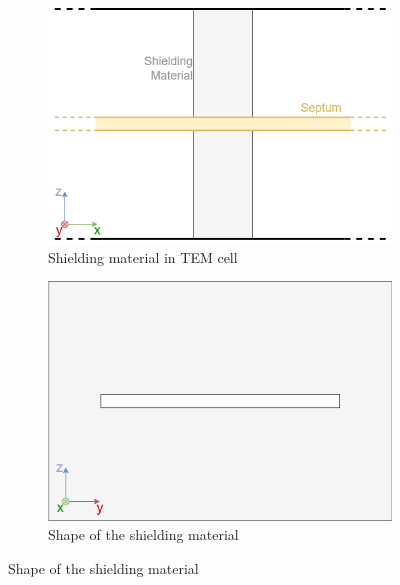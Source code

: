 \begin{figure}[h]
    \centering
    \begin{subfigure}[h]{0.49\textwidth}
        \centering
        \includegraphics[width=\textwidth]{content//10_theory//img/ASTM ES7-83.png}
        \caption{Shielding material in TEM cell}
        \label{fig:ASTM ES7-83}
    \end{subfigure}%
    \hfill
    \begin{subfigure}[h]{0.49\textwidth}
        \centering
        \includegraphics[width=\textwidth]{content//10_theory/img/form_of_shielding_material.png}
        \caption{Shape of the shielding material}
        \label{fig:form_of_shielding_material}
    \end{subfigure}
    \label{fig:subfigures}
\end{figure}

